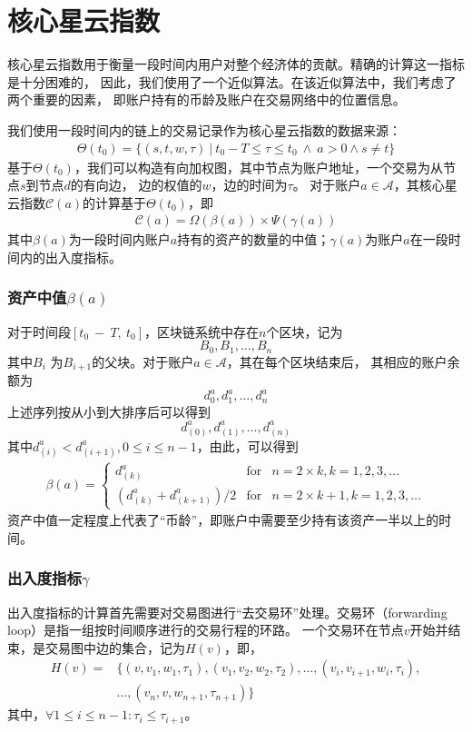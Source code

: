 \section{核心星云指数}
\begin{frame}
	核心星云指数用于衡量一段时间内用户对整个经济体的贡献。精确的计算这一指标是十分困难的，
  因此，我们使用了一个近似算法。在该近似算法中，我们考虑了两个重要的因素， 即账户持有的币龄及账户在交易网络中的位置信息。

  我们使用一段时间内的链上的交易记录作为核心星云指数的数据来源：
  \begin{align}
  \Theta(t_0) = \{(s, t, w, \tau)\ |\ t_0 - T \le \tau \le t_0\ \land \ a > 0 \land s \neq t \}
  \end{align}
  \noindent 基于$\Theta(t_0)$，我们可以构造有向加权图，其中节点为账户地址，一个交易为从节点$s$到节点$d$的有向边，
  边的权值的$w$，边的时间为$\tau$。
  对于账户$a \in \mathcal{A}$，其核心星云指数$\mathcal{C}(a)$的计算基于$\Theta(t_0)$，即
  \begin{align}
  \mathcal{C}(a) = \Omega(\beta(a)) \times{} \Psi(\gamma(a))
  \label{eq:rank}
  \end{align}
  \noindent 其中$\beta(a)$为一段时间内账户$a$持有的资产的数量的中值；$\gamma(a)$为账户$a$在一段时间内的出入度指标。
\end{frame}

\begin{frame}
\frametitle{资产中值$\beta(a)$}
对于时间段$[t_0\ −\ T,\ t_0]$，区块链系统中存在$n$个区块，记为
\[
B_0, B_1, \dots, B_n
\]
\noindent 其中$B_{i}$ 为$B_{i+1}$的父块。对于账户$a \in \mathcal{A}$，其在每个区块结束后，
其相应的账户余额为
\[
d^a_0, d^a_1, \dots, d^a_n
\]
上述序列按从小到大排序后可以得到
\[
d^a_{(0)}, d^a_{(1)}, \dots, d^a_{(n)}
\]
其中$d^a_{(i)} < d^a_{(i+1)}, 0\le i \le {n-1}$，由此，可以得到
\begin{align}
\beta(a) = \left\{ \begin{array}{rcl}
{d^a_{(k)}} & \mbox{for} & n=2\times{}k, k=1, 2, 3, \ldots \\
{(d^a_{(k)} + d^a_{(k+1)})/2} & \mbox{for} & n=2\times{}k + 1, k=1, 2, 3, \ldots
\end{array}\right.
\end{align}
资产中值一定程度上代表了“币龄”，即账户中需要至少持有该资产一半以上的时间。
\end{frame}

\begin{frame}
\frametitle{出入度指标$\gamma$}
出入度指标的计算首先需要对交易图进行“去交易环”处理。交易环（forwarding loop）是指一组按时间顺序进行的交易行程的环路。
一个交易环在节点$v$开始并结束，是交易图中边的集合，记为$H(v)$，即，
\[\begin{split}
H(v) =& \{(v, v_1, w_1, \tau_1), (v_1, v_2, w_2, \tau_2), \dots, (v_i, v_{i+1}, w_{i}, \tau_i), \\
& \dots, (v_n, v, w_{n+1}, \tau_{n+1})\}
\end{split}\]
\noindent 其中，$\forall 1\le i \le {n-1} : \tau_i \le \tau_{i+1} $。
\end{frame}

